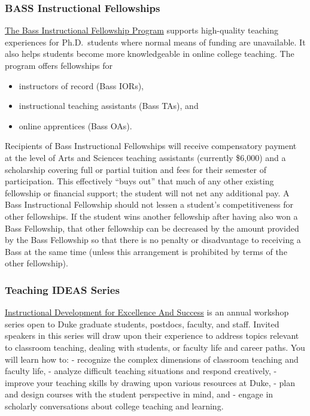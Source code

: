 \documentclass[
]{article}
\providecommand{\tightlist}{%
  \setlength{\itemsep}{0pt}\setlength{\parskip}{0pt}}
\begin{document}
\hypertarget{bass-instructional-fellowships}{%
\subsubsection{BASS Instructional Fellowships}\label{bass-instructional-fellowships}}

\href{https://gradschool.duke.edu/professional-development/programs/bass-instructional-fellowships}{The Bass Instructional Fellowship Program} supports high-quality teaching experiences for Ph.D.~students where normal means of funding are unavailable. It also helps students become more knowledgeable in online college teaching. The program offers fellowships for

\begin{itemize}
\tightlist
\item
  instructors of record (Bass IORs),
\item
  instructional teaching assistants (Bass TAs), and
\item
  online apprentices (Bass OAs).
\end{itemize}

Recipients of Bass Instructional Fellowships will receive compensatory payment at the level of Arts and Sciences teaching assistants (currently \$6,000) and a scholarship covering full or partial tuition and fees for their semester of participation. This effectively ``buys out'' that much of any other existing fellowship or financial support; the student will not net any additional pay. A Bass Instructional Fellowship should not lessen a student's competitiveness for other fellowships. If the student wins another fellowship after having also won a Bass Fellowship, that other fellowship can be decreased by the amount provided by the Bass Fellowship so that there is no penalty or disadvantage to receiving a Bass at the same time (unless this arrangement is prohibited by terms of the other fellowship).

\hypertarget{teaching-ideas-series}{%
\subsubsection{Teaching IDEAS Series}\label{teaching-ideas-series}}

\href{https://gradschool.duke.edu/professional-development/programs/teaching-ideas-series}{Instructional Development for Excellence And Success} is an annual workshop series open to Duke graduate students, postdocs, faculty, and staff. Invited speakers in this series will draw upon their experience to address topics relevant to classroom teaching, dealing with students, or faculty life and career paths. You will learn how to:
- recognize the complex dimensions of classroom teaching and faculty life,
- analyze difficult teaching situations and respond creatively,
- improve your teaching skills by drawing upon various resources at Duke,
- plan and design courses with the student perspective in mind, and
- engage in scholarly conversations about college teaching and learning.
\end{document}
